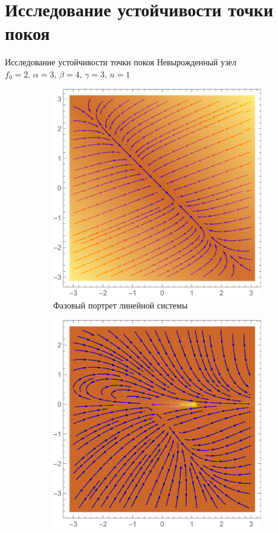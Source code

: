 \documentclass{beamer}
\begin{document}
\section{Исследование устойчивости точки покоя}
\begin{frame}{Исследование устойчивости точки покоя}
		\centering
	\large
	Невырожденный узел
	$f_0=2,\,\alpha=3,\,\beta=4,\,\gamma=3,\,u=1$
	\begin{figure}[H]
		\centering
		\begin{subfigure}[H]{0.4\textwidth}
			\includegraphics[width=\textwidth]{p1_2_1}
			\captionsetup{labelformat=empty}
			\caption{Фазовый портрет линейной системы}
		\end{subfigure}
		\qquad\qquad
		\begin{subfigure}[H]{0.4\textwidth}
			\includegraphics[width=\textwidth]{p1_2_2}

\end{subfigure}
\end{figure}
\end{frame}
\end{document}
